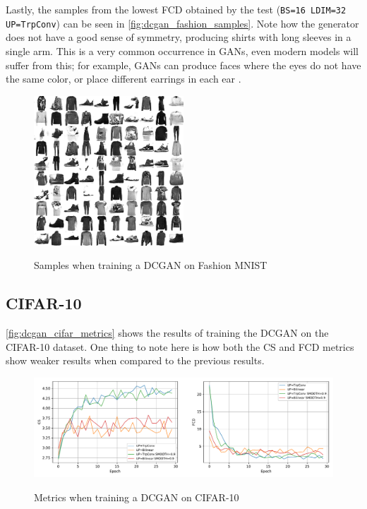 Lastly, the samples from the lowest \gls{FCD} obtained by the test (\texttt{BS=16 LDIM=32 UP=TrpConv}) can be seen in \autoref{fig:dcgan_fashion_samples}. Note how the generator does not have a good sense of symmetry, producing shirts with long sleeves in a single arm. This is a very common occurrence in \acp{GAN}, even modern models will suffer from this; for example, \acp{GAN} can produce faces where the eyes do not have the same color, or place different earrings in each ear \cite{gan_asymmetry2018}.
\begin{figure}[hbt]
    \centering
    \caption{Samples when training a DCGAN on Fashion MNIST}
    \includegraphics[width=0.5\textwidth]{chapters/Experiments/DCGAN/fashion_samples.png}
    \label{fig:dcgan_fashion_samples}
\end{figure}


\subsection{CIFAR-10}
\autoref{fig:dcgan_cifar_metrics} shows the results of training the \gls{DCGAN} on the \gls{CIFAR}-10 dataset. One thing to note here is how both the \gls{CS} and \gls{FCD} metrics show weaker results when compared to the previous results.
\begin{figure}[hbt]
    \centering
    \caption{Metrics when training a DCGAN on CIFAR-10}
    \includegraphics[width=\textwidth]{chapters/Experiments/DCGAN/cifar_metrics.pdf}
    \label{fig:dcgan_cifar_metrics}
\end{figure}

